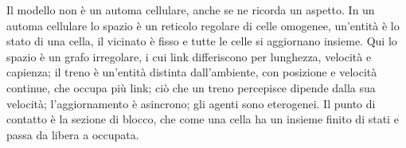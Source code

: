Il modello non è un automa cellulare, anche se ne ricorda un aspetto. In un automa cellulare lo spazio è un reticolo regolare di celle omogenee, un'entità è lo stato di una cella, il vicinato è fisso e tutte le celle si aggiornano insieme. Qui lo spazio è un grafo irregolare, i cui link differiscono per lunghezza, velocità e capienza; il treno è un'entità distinta dall'ambiente, con posizione e velocità continue, che occupa più link; ciò che un treno percepisce dipende dalla sua velocità; l'aggiornamento è asincrono; gli agenti sono eterogenei. Il punto di contatto è la sezione di blocco, che come una cella ha un insieme finito di stati e passa da libera a occupata.
